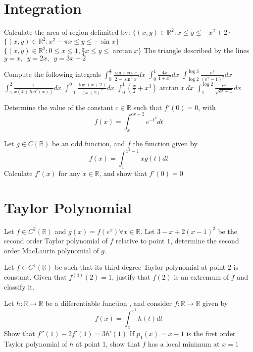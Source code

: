\documentclass[12pt]{article}
\begin{document}
\section{Integration}
\begin{ExerciseList}
	\Exercise Calculate the area of region delimited by:
	\Question $\{(x,y)\in\mathbb R^2 \colon x\le y\le -x^2+2\}$
	\Question $\{ (x,y)\in\mathbb R^2 \colon x^2-\pi x\le y \le -\sin{x} \}$
	\Question $\{ (x,y)\in\mathbb R^2 \colon 0\le x\le 1,\frac{\pi}{4}x\le y\le\arctan x \}$
	\Question The triangle described by the lines $y=x,\enspace y=2x,\enspace y=3x-2$

	\Exercise Compute the following integrals
	\Question $\int_0^{\frac{\pi}{2}}\frac{\sin x \cos x}{2+\sin^2x}dx$
	\Question $\int_0^1{\frac{4x}{4+x^2}}dx$
	\Question $\int_{\log 2}^{\log 3}{\frac{e^x}{(e^x-1)^2}}dx$
	\Question $\int_1^2{\frac{1}{x(4+log^2(x))}}dx$
	\Question $\int_{-1}^0\frac{\log(x+2)}{(x+2)^2}dx$
	\Question $\int_0^1{(\frac{x}{2}+x^3)\arctan{x}}\: dx$
	\Question $\int_1^{\log{2}}{\frac{e^x}{\sqrt{e^x - 1}}}dx$

	\Exercise Determine the value of the constant $c\in\mathbb R$ such that $f'(0) = 0$, with
	$$f(x)=\int_x^{cx+2}{e^{-t^2}}dt$$

	\Exercise Let $g\in C(\mathbb R)$ be an odd function, and $f$ the function given by
	$$f(x)=\int_1^{x^2-1}{xg(t)}dt$$
	Calculate $f'(x)$ for any $x\in\mathbb R$, and show that $f'(0)=0$

\end{ExerciseList}

\section{Taylor Polynomial}
\begin{ExerciseList}
	\Exercise Let $f\in C^2(\mathbb R)$ and $g(x)=f(e^x)\forall x\in\mathbb R$.
	Let $3-x+2(x-1)^2$ be the second order Taylor polynomial of $f$ relative
	to point $1$, determine the second order MacLaurin polynomial of $g$.

	\Exercise Let $f\in C^4(\mathbb R)$ be such that its third degree Taylor
	polynomial at point $2$ is constant. Given that $f^{(4)}(2)=1$, justify that
	$f(2)$ is an extremum of $f$ and classify it.

	\Exercise Let $h\colon \mathbb R \to \mathbb R$ be a differentiable function
	, and consider $f\colon \mathbb R\to\mathbb R$ given by
	$$f(x)=\int_x^{x^2}{h(t)}dt$$
	\Question Show that $f''(1)-2f'(1)=3h'(1)$
	\Question If $p_1(x)=x-1$ is the first order Taylor polynomial of $h$ at point $1$,
	show that $f$ has a local minimum at $x=1$
\end{ExerciseList}
\end{document}

